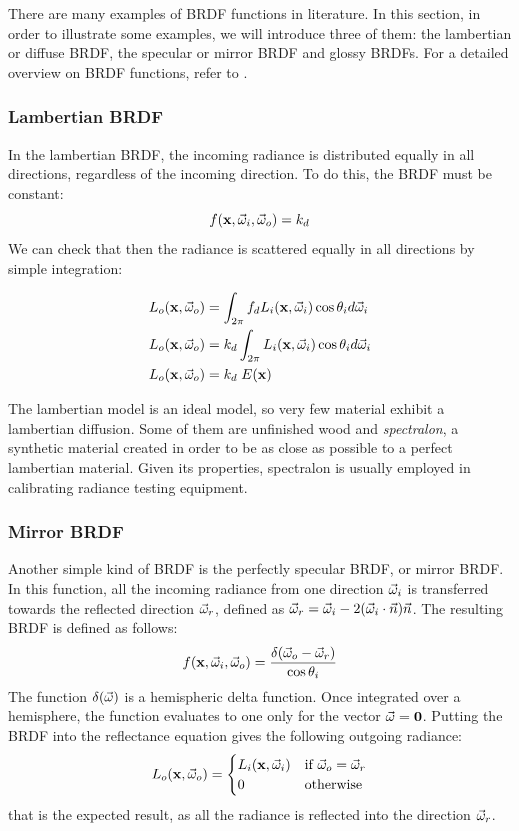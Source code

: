 There are many examples of BRDF functions in literature. In this section, in order to illustrate some examples, we will introduce three of them: the lambertian or diffuse BRDF, the specular or mirror BRDF and glossy BRDFs. For a detailed overview on BRDF functions, refer to \citep{RTR3}.

\subsubsection{Lambertian BRDF}
In the lambertian BRDF, the incoming radiance is distributed equally in all directions, regardless of the incoming direction. To do this, the BRDF must be constant:
$$
f(\mathbf{x}, \vec{\omega}_i, \vec{\omega}_o) = k_d
$$
We can check that then the radiance is scattered equally in all directions by simple integration:

\begin{equation*}
\begin{split}
L_o(\mathbf{x}, \vec{\omega}_o) &= \int_{2\pi} f_d L_i(\mathbf{x}, \vec{\omega}_i) \cos\theta_i d\vec{\omega}_i \\
L_o(\mathbf{x}, \vec{\omega}_o) &= k_d \int_{2\pi} L_i(\mathbf{x}, \vec{\omega}_i) \cos\theta_i d\vec{\omega}_i \\
L_o(\mathbf{x}, \vec{\omega}_o) &= k_d \; E(\mathbf{x}) \\
\end{split}
\end{equation*}

The lambertian model is an ideal model, so very few material exhibit a lambertian diffusion. Some of them are unfinished wood and \emph{spectralon}, a synthetic material created in order to be as close as possible to a perfect lambertian material. Given its properties, spectralon is usually employed in calibrating radiance testing equipment. 

\subsubsection{Mirror BRDF}

Another simple kind of BRDF is the perfectly specular BRDF, or mirror BRDF. In this function, all the incoming radiance from one direction $\vec{\omega}_i$ is transferred towards the reflected direction $\vec{\omega}_r$, defined as $\vec{\omega}_r = \vec{\omega}_i - 2 (\vec{\omega}_i \cdot \vec{n}) \vec{n}$. The resulting BRDF is defined as follows:
$$
f(\mathbf{x}, \vec{\omega}_i, \vec{\omega}_o) = \frac{\delta(\vec{\omega}_o - \vec{\omega}_r)}{\cos\theta_i} 
$$
The function $\delta(\vec{\omega})$ is a hemispheric delta function. Once integrated over a hemisphere, the function evaluates to one only for the vector $\vec{\omega} = \mathbf{0}$. Putting the BRDF into the reflectance equation gives the following outgoing radiance:
\begin{equation*}
L_o(\mathbf{x}, \vec{\omega}_o) = \begin{cases}
L_i(\mathbf{x}, \vec{\omega}_i)  &\text{if $\vec{\omega}_o = \vec{\omega}_r$}\\
0 &\text{otherwise}
\end{cases}
\end{equation*}
that is the expected result, as all the radiance is reflected into the direction $\vec{\omega}_r$.


